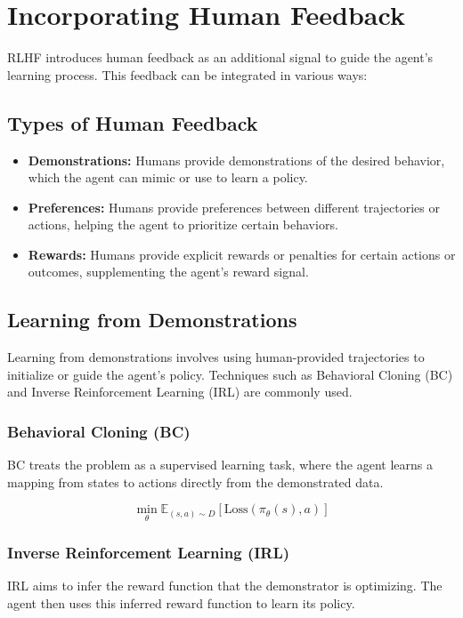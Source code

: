\section{Incorporating Human Feedback}
RLHF introduces human feedback as an additional signal to guide the agent's learning process. This feedback can be integrated in various ways:

\subsection{Types of Human Feedback}
\begin{itemize}
    \item \textbf{Demonstrations:} Humans provide demonstrations of the desired behavior, which the agent can mimic or use to learn a policy.
    \item \textbf{Preferences:} Humans provide preferences between different trajectories or actions, helping the agent to prioritize certain behaviors.
    \item \textbf{Rewards:} Humans provide explicit rewards or penalties for certain actions or outcomes, supplementing the agent's reward signal.
\end{itemize}

\subsection{Learning from Demonstrations}
Learning from demonstrations involves using human-provided trajectories to initialize or guide the agent's policy. Techniques such as Behavioral Cloning (BC) and Inverse Reinforcement Learning (IRL) are commonly used.

\subsubsection{Behavioral Cloning (BC)}
BC treats the problem as a supervised learning task, where the agent learns a mapping from states to actions directly from the demonstrated data.

\begin{equation}
\min_\theta \mathbb{E}_{(s,a) \sim D} \left[ \text{Loss}(\pi_\theta(s), a) \right]
\end{equation}

\subsubsection{Inverse Reinforcement Learning (IRL)}
IRL aims to infer the reward function that the demonstrator is optimizing. The agent then uses this inferred reward function to learn its policy.

